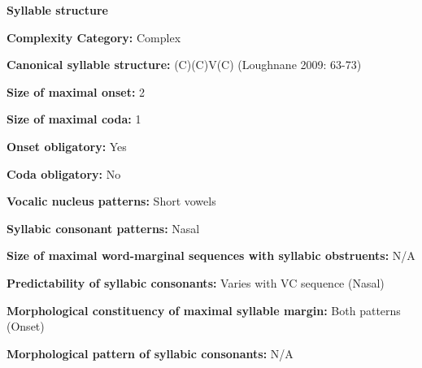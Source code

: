 \begin{styleBody}
\textbf{Syllable structure}
\end{styleBody}

\begin{styleBody}
\textbf{Complexity Category:} Complex
\end{styleBody}

\begin{styleBody}
\textbf{Canonical syllable structure:} (C)(C)V(C) (Loughnane 2009: 63-73)
\end{styleBody}

\begin{styleBody}
\textbf{Size of maximal onset:} 2
\end{styleBody}

\begin{styleBody}
\textbf{Size of maximal coda:} 1
\end{styleBody}

\begin{styleBody}
\textbf{Onset obligatory:} Yes
\end{styleBody}

\begin{styleBody}
\textbf{Coda obligatory:} No
\end{styleBody}

\begin{styleBody}
\textbf{Vocalic nucleus patterns:} Short vowels
\end{styleBody}

\begin{styleBody}
\textbf{Syllabic consonant patterns:} Nasal
\end{styleBody}

\begin{styleBody}
\textbf{Size of maximal word{}-marginal sequences with syllabic obstruents:} N/A
\end{styleBody}

\begin{styleBody}
\textbf{Predictability of syllabic consonants:} Varies with VC sequence (Nasal)
\end{styleBody}

\begin{styleBody}
\textbf{Morphological constituency of maximal syllable margin:} Both patterns (Onset)
\end{styleBody}

\begin{styleBody}
\textbf{Morphological pattern of syllabic consonants:} N/A
\end{styleBody}

